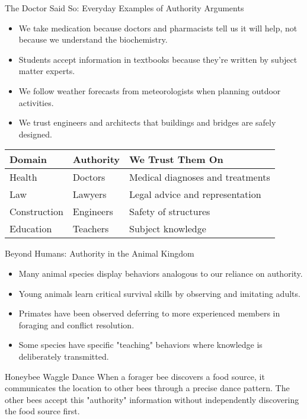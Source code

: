 \documentclass{beamer}
\begin{document}
\begin{frame}{The Doctor Said So: Everyday Examples of Authority Arguments}
    \begin{itemize}
        \item We take medication because doctors and pharmacists tell us it will help, not because we understand the biochemistry.
        \item Students accept information in textbooks because they're written by subject matter experts.
        \item We follow weather forecasts from meteorologists when planning outdoor activities.
        \item We trust engineers and architects that buildings and bridges are safely designed.
    \end{itemize}
    
    \begin{table}
        \begin{tabular}{|l|l|l|}
            \hline
            \textbf{Domain} & \textbf{Authority} & \textbf{We Trust Them On} \\
            \hline
            Health & Doctors & Medical diagnoses and treatments \\
            Law & Lawyers & Legal advice and representation \\
            Construction & Engineers & Safety of structures \\
            Education & Teachers & Subject knowledge \\
            \hline
        \end{tabular}
    \end{table}
\end{frame}

\begin{frame}{Beyond Humans: Authority in the Animal Kingdom}
    \begin{itemize}
        \item Many animal species display behaviors analogous to our reliance on authority.
        \item Young animals learn critical survival skills by observing and imitating adults.
        \item Primates have been observed deferring to more experienced members in foraging and conflict resolution.
        \item Some species have specific "teaching" behaviors where knowledge is deliberately transmitted.
    \end{itemize}
    
    \begin{example}{Honeybee Waggle Dance}
        When a forager bee discovers a food source, it communicates the location to other bees through a precise dance pattern. The other bees accept this "authority" information without independently discovering the food source first.
    \end{example}
\end{frame}
\end{document}
